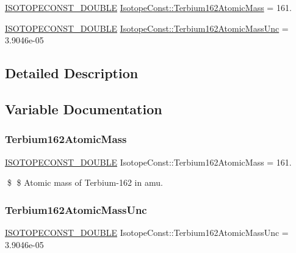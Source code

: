 \begin{DoxyCompactItemize}
\item 
\mbox{\hyperlink{group___isotope_const-_macros_ga8f45a7272ce02c0b4c65c44636ed719a}{I\+S\+O\+T\+O\+P\+E\+C\+O\+N\+S\+T\+\_\+\+D\+O\+U\+B\+LE}} \mbox{\hyperlink{group___isotope_const-_terbium-_tb162_ga1e183653cd3ad50306cc56c1f2fe8f94}{Isotope\+Const\+::\+Terbium162\+Atomic\+Mass}} = 161.
\item 
\mbox{\hyperlink{group___isotope_const-_macros_ga8f45a7272ce02c0b4c65c44636ed719a}{I\+S\+O\+T\+O\+P\+E\+C\+O\+N\+S\+T\+\_\+\+D\+O\+U\+B\+LE}} \mbox{\hyperlink{group___isotope_const-_terbium-_tb162_ga8ecfb47b188c82bb472a0c5c7d35a0ee}{Isotope\+Const\+::\+Terbium162\+Atomic\+Mass\+Unc}} = 3.\+9046e-\/05
\end{DoxyCompactItemize}


\subsection{Detailed Description}


\subsection{Variable Documentation}
\mbox{\label{group___isotope_const-_terbium-_tb162_ga1e183653cd3ad50306cc56c1f2fe8f94}} 
\subsubsection{\texorpdfstring{Terbium162\+Atomic\+Mass}{Terbium162AtomicMass}}
{\footnotesize\ttfamily \mbox{\hyperlink{group___isotope_const-_macros_ga8f45a7272ce02c0b4c65c44636ed719a}{I\+S\+O\+T\+O\+P\+E\+C\+O\+N\+S\+T\+\_\+\+D\+O\+U\+B\+LE}} Isotope\+Const\+::\+Terbium162\+Atomic\+Mass = 161.}

\$ \$ Atomic mass of Terbium-\/162 in amu. \mbox{\label{group___isotope_const-_terbium-_tb162_ga8ecfb47b188c82bb472a0c5c7d35a0ee}} 
\subsubsection{\texorpdfstring{Terbium162\+Atomic\+Mass\+Unc}{Terbium162AtomicMassUnc}}
{\footnotesize\ttfamily \mbox{\hyperlink{group___isotope_const-_macros_ga8f45a7272ce02c0b4c65c44636ed719a}{I\+S\+O\+T\+O\+P\+E\+C\+O\+N\+S\+T\+\_\+\+D\+O\+U\+B\+LE}} Isotope\+Const\+::\+Terbium162\+Atomic\+Mass\+Unc = 3.\+9046e-\/05}

